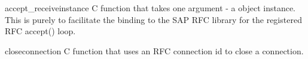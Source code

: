 \documentclass{howto}
\begin{document}
\begin{funcdesc}{accept_receive}{instance}
C function that takes one argument - a  object instance.
This is purely to facilitate the binding to the SAP RFC library for the registered RFC accept() loop.
\end{funcdesc}

\begin{funcdesc}{close}{connection}
C function that uses an RFC connection id to close a connection.
\end{funcdesc}
\end{document}
